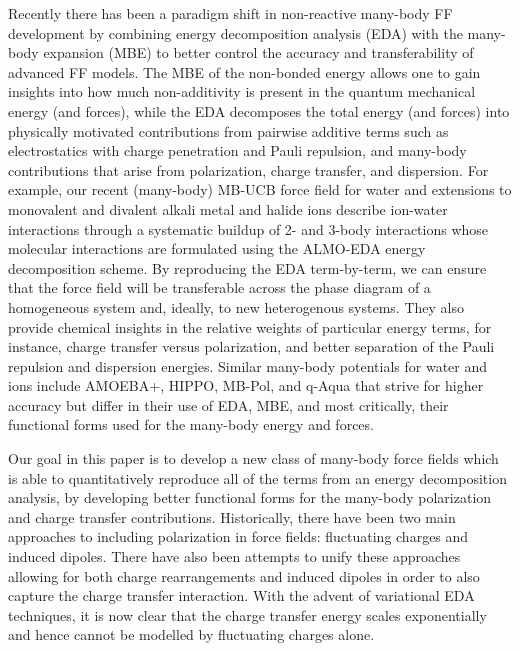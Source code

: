 \documentclass[journal=jctcce,manuscript=article]{achemso}
\begin{document}
Recently there has been a paradigm shift in non-reactive many-body FF development by combining energy decomposition analysis (EDA)\cite{Szalewicz:2012:SAPT,Patkowski:2020:SAPT,Mao:2021:EDA-review} with the many-body expansion (MBE)\cite{demerdash2017assessing, heindel2020many} to better control the accuracy and transferability of advanced FF models. The MBE of the non-bonded  energy\cite{heindel2020many} allows one to gain insights into how much non-additivity is present in the quantum mechanical energy (and forces), while the EDA decomposes the total energy (and forces) into physically motivated contributions from pairwise additive terms such as electrostatics with charge penetration and Pauli repulsion, and many-body contributions that arise from polarization, charge transfer, and dispersion. For example, our recent (many-body) MB-UCB force field for water\cite{das2019development} and extensions to monovalent and divalent alkali metal and halide ions\cite{} describe ion-water interactions through a systematic buildup of 2- and 3-body interactions whose molecular interactions are formulated using the ALMO-EDA energy decomposition scheme.\cite{mao2021intermolecular} By reproducing the EDA term-by-term, we can ensure that the force field will be transferable across the phase diagram of a homogeneous system and, ideally, to new heterogenous systems. They also provide chemical insights in the relative weights of particular energy terms, for instance, charge transfer versus polarization, and better separation of the Pauli repulsion and dispersion energies. Similar many-body potentials for water and ions include AMOEBA+, HIPPO\cite{rackers2021polarizable}, MB-Pol, and q-Aqua that strive for higher accuracy but differ in their use of EDA, MBE, and most critically, their functional forms used for the many-body energy and forces.

Our goal in this paper is to develop a new class of many-body force fields which is able to quantitatively reproduce all of the terms from an energy decomposition analysis, by developing  better functional forms for the many-body polarization and charge transfer contributions. Historically, there have been two main approaches to including polarization in force fields: fluctuating charges\cite{rick1994dynamical} and induced dipoles\cite{applequist1985multipole}. There have also been attempts to unify these approaches allowing for both charge rearrangements and induced dipoles\cite{stern2001combined} in order to also capture the charge transfer interaction.\cite{rick1994dynamical} With the advent
of variational EDA  techniques\cite{khaliullin2007,horn2016probing,Mao:2021:EDA-review},
it is now clear that the charge transfer energy scales exponentially and hence
cannot be modelled by fluctuating charges alone.
\end{document}
